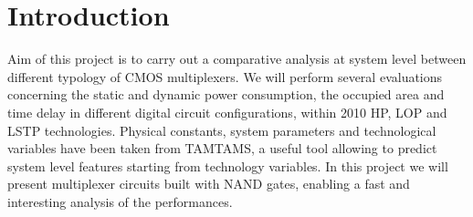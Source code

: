 \chapter{Introduction}
Aim of this project is to carry out a comparative analysis at system level between different typology of CMOS multiplexers. We will perform several evaluations concerning the static and dynamic power consumption, the occupied area and time delay in different digital circuit configurations, within 2010 HP, LOP and LSTP technologies. Physical constants, system parameters and technological variables have been taken from TAMTAMS, a useful tool allowing to predict system level features starting from technology variables. In this project we will present multiplexer circuits built with NAND gates, enabling a fast and interesting analysis of the performances.

